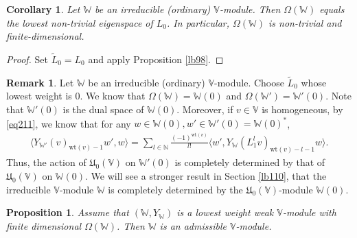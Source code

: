 \documentclass[12pt,a4paper,notitlepage]{report}
\theoremstyle{definition}
\newtheorem{rem}[df]{Remark}
\theoremstyle{plain}
\newtheorem{pp}[df]{Proposition}
\newtheorem{co}[df]{Corollary}
\newcommand{\fk}{\mathfrak}
\newcommand{\wtd}{\widetilde}
\newcommand{\bk}[1]{\langle {#1}\rangle}
\newcommand{\Vbb}{\mathbb V}
\newcommand{\Wbb}{\mathbb W}
\newcommand{\Nbb}{\mathbb N}
\newcommand{\wt}{\mathrm{wt}}
\numberwithin{equation}{section}
\begin{document}
\begin{co}\label{lb130}
Let $\Wbb$ be an irreducible (ordinary)  $\Vbb$-module. Then $\Omega(\Wbb)$ equals the lowest non-trivial eigenspace of $L_0$. In particular, $\Omega(\Wbb)$ is non-trivial and finite-dimensional.
\end{co}

\begin{proof}
Set $\wtd L_0=L_0$ and apply Proposition \ref{lb98}.
\end{proof}



\begin{rem}\label{lb111}
Let $\Wbb$ be an irreducible (ordinary) $\Vbb$-module. Choose $\wtd L_0$ whose lowest weight is $0$. We know that $\Omega(\Wbb)=\Wbb(0)$ and $\Omega(\Wbb')=\Wbb'(0)$. Note that $\Wbb'(0)$ is the dual space of $\Wbb(0)$. Moreover, if $v\in\Vbb$ is homogeneous,  by \eqref{eq211}, we know that for any $w\in\Wbb(0),w'\in\Wbb'(0)=\Wbb(0)^*$,
\begin{align}
\bk{Y_{\Wbb'}(v)_{\wt(v)-1}w',w}=\sum_{l\in\Nbb}\frac{(-1)^{\wt(v)}}{l!}\bk{w',Y_\Wbb(L_1^lv)_{\wt(v)-l-1}w}.\label{eq215}
\end{align}
Thus, the action of $\fk U_0(\Vbb)$ on $\Wbb'(0)$ is completely determined by that of $\fk U_0(\Vbb)$ on $\Wbb(0)$. We will see a stronger result in Section \ref{lb110}, that the irreducible $\Vbb$-module $\Wbb$ is completely determined by the $\fk U_0(\Vbb)$-module $\Wbb(0)$.
\end{rem}





\begin{pp}\label{lb97}
Assume that $(\Wbb,Y_\Wbb)$ is a lowest weight weak $\Vbb$-module with finite dimensional $\Omega(\Wbb)$. Then $\Wbb$ is an admissible $\Vbb$-module.
\end{pp}
\end{document}
